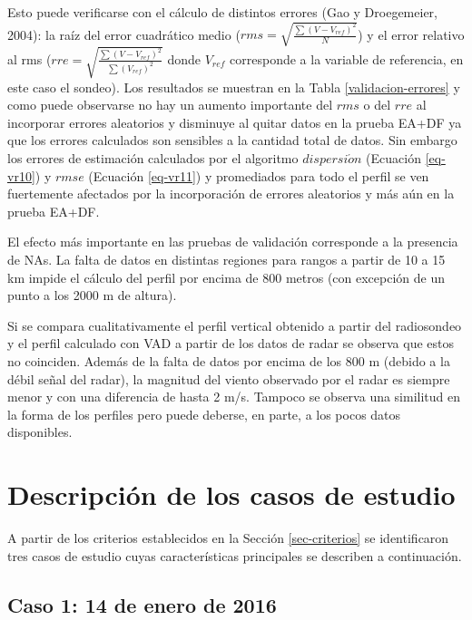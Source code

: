 \documentclass[12pt,spanish,oneside, a4paper]{book}
\begin{document}
Esto puede verificarse con el cálculo de distintos errores (Gao y
Droegemeier, 2004): la raíz del error cuadrático medio
(\(rms = \sqrt{ \frac{\sum (V-V_{ref})^2}{N} }\)) y el error relativo al
rms (\(rre = \sqrt{ \frac{\sum (V-V_{ref})^2}{\sum (V_{ref})^2} }\)
donde \(V_{ref}\) corresponde a la variable de referencia, en este caso
el sondeo). Los resultados se muestran en la Tabla
\ref{validacion-errores} y como puede observarse no hay un aumento
importante del \(rms\) o del \(rre\) al incorporar errores aleatorios y
disminuye al quitar datos en la prueba EA+DF ya que los errores
calculados son sensibles a la cantidad total de datos. Sin embargo los
errores de estimación calculados por el algoritmo \(dispersi\acute{o}n\)
(Ecuación \ref{eq-vr10}) y \(rmse\) (Ecuación \ref{eq-vr11}) y
promediados para todo el perfil se ven fuertemente afectados por la
incorporación de errores aleatorios y más aún en la prueba EA+DF.

El efecto más importante en las pruebas de validación corresponde a la
presencia de NAs. La falta de datos en distintas regiones para rangos a
partir de 10 a 15 km impide el cálculo del perfil por encima de 800
metros (con excepción de un punto a los 2000 m de altura).

Si se compara cualitativamente el perfil vertical obtenido a partir del
radiosondeo y el perfil calculado con VAD a partir de los datos de radar
se observa que estos no coinciden. Además de la falta de datos por
encima de los 800 m (debido a la débil señal del radar), la magnitud del
viento observado por el radar es siempre menor y con una diferencia de
hasta 2 m/s. Tampoco se observa una similitud en la forma de los
perfiles pero puede deberse, en parte, a los pocos datos disponibles.

\section{Descripción de los casos de
estudio}\label{descripcion-de-los-casos-de-estudio}

A partir de los criterios establecidos en la Sección \ref{sec-criterios}
se identificaron tres casos de estudio cuyas características principales
se describen a continuación.

\subsection{Caso 1: 14 de enero de
2016}\label{caso-1-14-de-enero-de-2016}
\end{document}
